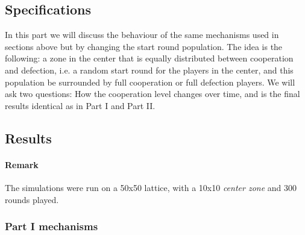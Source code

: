 \documentclass[letterpaper]{article}
\begin{document}
\subsection{Specifications}


In this part we will discuss the behaviour of the same mechanisms used
in sections above but by changing the start round population. The idea is the
following: a zone in the center that is equally distributed
between cooperation and defection, i.e. a random start round for the
players in the center, and this population be surrounded by
full cooperation or full defection players. We will ask two questions:
How the cooperation level changes over time, and is the final results
identical as in Part I and Part II.

\subsection{Results}

\paragraph{Remark} The simulations were run on a 50x50 lattice, with
a 10x10 \textit{center zone} and 300 rounds played.

\subsubsection{Part I mechanisms}
\end{document}
